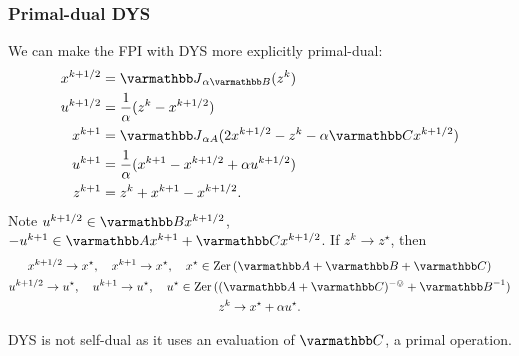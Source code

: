 \documentclass[10pt,mathserif]{beamer}
\begin{document}
\begin{frame}[plain]
\frametitle{Primal-dual DYS}

We can make the FPI with DYS more explicitly primal-dual:
\begin{align*}
x^{k+1/2}&=\opJ_{\alpha \opB}(z^k)\\
 u ^{k+1/2}&=\frac{1}{\alpha}(z^k-x^{k+1/2})\\
x^{k+1}&=\opJ_{\alpha A}(2x^{k+1/2}-z^k-\alpha \opC x^{k+1/2})\\
 u ^{k+1}&=\frac{1}{\alpha}(x^{k+1}-x^{k+1/2}+\alpha u ^{k+1/2})\\
z^{k+1}&=z^k+x^{k+1}-x^{k+1/2}.
\end{align*}
Note $ u ^{k+1/2}\in \opB x^{k+1/2}$, $- u ^{k+1}\in \opA x^{k+1}+\opC x^{k+1/2}$.
If $z^k\rightarrow z^\star$, then
\begin{gather*}
x^{k+1/2}\rightarrow x^\star,\quad x^{k+1}\rightarrow x^\star,\quad
x^\star\in \zer(\opA+\opB+\opC)\\
 u ^{k+1/2}\rightarrow  u ^\star
,\quad
 u ^{k+1}\rightarrow  u ^\star,\quad
 u ^\star\in \zer((\opA+\opC)^{-\ovee}+\opB^{-1})\\
z^k\rightarrow x^\star+\alpha u ^\star.
\end{gather*}
\vspace{0.0in}

DYS is not self-dual as it uses an evaluation of $\opC$, a primal operation.
\end{frame}
\end{document}
